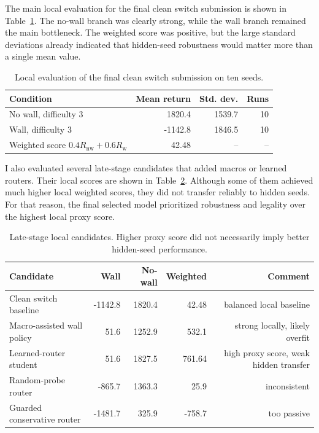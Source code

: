 \documentclass[11pt, oneside]{article}   	%
\begin{document}
The main local evaluation for the final clean switch submission is shown in Table~\ref{tab:final_eval}. The no-wall branch was clearly strong, while the wall branch remained the main bottleneck. The weighted score was positive, but the large standard deviations already indicated that hidden-seed robustness would matter more than a single mean value.

\begin{table}[H]
\centering
\begin{tabular}{lrrr}
\toprule
Condition & Mean return & Std. dev. & Runs \\
\midrule
No wall, difficulty 3 & 1820.4 & 1539.7 & 10 \\
Wall, difficulty 3 & -1142.8 & 1846.5 & 10 \\
\midrule
Weighted score \(0.4R_{\mathrm{nw}}+0.6R_{\mathrm{w}}\) & 42.48 & -- & -- \\
\bottomrule
\end{tabular}
\caption{Local evaluation of the final clean switch submission on ten seeds.}
\label{tab:final_eval}
\end{table}

I also evaluated several late-stage candidates that added macros or learned routers. Their local scores are shown in Table~\ref{tab:late_candidates}. Although some of them achieved much higher local weighted scores, they did not transfer reliably to hidden seeds. For that reason, the final selected model prioritized robustness and legality over the highest local proxy score.

\begin{table}[H]
\centering
\small
\begin{tabular}{p{}rrrr}
\toprule
Candidate & Wall & No-wall & Weighted & Comment \\
\midrule
Clean switch baseline & -1142.8 & 1820.4 & 42.48 & balanced local baseline \\
Macro-assisted wall policy & 51.6 & 1252.9 & 532.1 & strong locally, likely overfit \\
Learned-router student & 51.6 & 1827.5 & 761.64 & high proxy score, weak hidden transfer \\
Random-probe router & -865.7 & 1363.3 & 25.9 & inconsistent \\
Guarded conservative router & -1481.7 & 325.9 & -758.7 & too passive \\
\bottomrule
\end{tabular}
\caption{Late-stage local candidates. Higher proxy score did not necessarily imply better hidden-seed performance.}
\label{tab:late_candidates}
\end{table}
\end{document}
